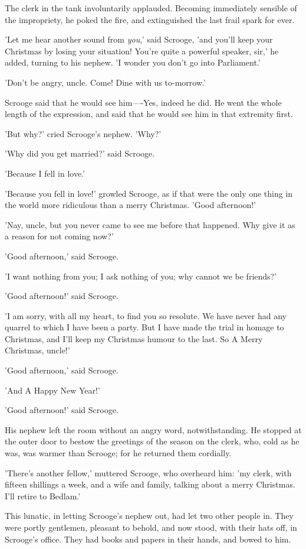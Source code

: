 The clerk in the tank involuntarily applauded. Becoming immediately
sensible of the impropriety, he poked the fire, and extinguished the
last frail spark for ever.

'Let me hear another sound from \emph{you},' said Scrooge, 'and you'll keep
your Christmas by losing your situation! You're quite a powerful
speaker, sir,' he added, turning to his nephew. 'I wonder you don't go
into Parliament.'

'Don't be angry, uncle. Come! Dine with us to-morrow.'

Scrooge said that he would see him----Yes, indeed he did. He went the
whole length of the expression, and said that he would see him in that
extremity first.

'But why?' cried Scrooge's nephew. 'Why?'

'Why did you get married?' said Scrooge.

'Because I fell in love.'

'Because you fell in love!' growled Scrooge, as if that were the only
one thing in the world more ridiculous than a merry Christmas. 'Good
afternoon!'

'Nay, uncle, but you never came to see me before that happened. Why give
it as a reason for not coming now?'

'Good afternoon,' said Scrooge.

'I want nothing from you; I ask nothing of you; why cannot we be
friends?'

'Good afternoon!' said Scrooge.

'I am sorry, with all my heart, to find you so resolute. We have never
had any quarrel to which I have been a party. But I have made the trial
in homage to Christmas, and I'll keep my Christmas humour to the last.
So A Merry Christmas, uncle!'

'Good afternoon,' said Scrooge.

'And A Happy New Year!'

'Good afternoon!' said Scrooge.

His nephew left the room without an angry word, notwithstanding. He
stopped at the outer door to bestow the greetings of the season on the
clerk, who, cold as he was, was warmer than Scrooge; for he returned
them cordially.

'There's another fellow,' muttered Scrooge, who overheard him: 'my
clerk, with fifteen shillings a week, and a wife and family, talking
about a merry Christmas. I'll retire to Bedlam.'

This lunatic, in letting Scrooge's nephew out, had let two other people
in. They were portly gentlemen, pleasant to behold, and now stood, with
their hats off, in Scrooge's office. They had books and papers in their
hands, and bowed to him.

